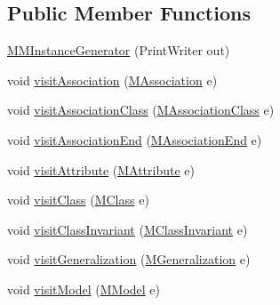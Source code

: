 \subsection*{Public Member Functions}
\begin{DoxyCompactItemize}
\item 
\hyperlink{classorg_1_1tzi_1_1use_1_1uml_1_1mm_1_1_m_m_instance_generator_ac0f6502d926d16ac433a7df353c2992a}{M\-M\-Instance\-Generator} (Print\-Writer out)
\item 
void \hyperlink{classorg_1_1tzi_1_1use_1_1uml_1_1mm_1_1_m_m_instance_generator_a21ebb5146935bb8b26401562a7734960}{visit\-Association} (\hyperlink{interfaceorg_1_1tzi_1_1use_1_1uml_1_1mm_1_1_m_association}{M\-Association} e)
\item 
void \hyperlink{classorg_1_1tzi_1_1use_1_1uml_1_1mm_1_1_m_m_instance_generator_a54fe169371d10caef410f4f86564de87}{visit\-Association\-Class} (\hyperlink{interfaceorg_1_1tzi_1_1use_1_1uml_1_1mm_1_1_m_association_class}{M\-Association\-Class} e)
\item 
void \hyperlink{classorg_1_1tzi_1_1use_1_1uml_1_1mm_1_1_m_m_instance_generator_aab9bb303d302971e972638e3a37b2390}{visit\-Association\-End} (\hyperlink{classorg_1_1tzi_1_1use_1_1uml_1_1mm_1_1_m_association_end}{M\-Association\-End} e)
\item 
void \hyperlink{classorg_1_1tzi_1_1use_1_1uml_1_1mm_1_1_m_m_instance_generator_a0b27339eea20544956859e117a580df7}{visit\-Attribute} (\hyperlink{classorg_1_1tzi_1_1use_1_1uml_1_1mm_1_1_m_attribute}{M\-Attribute} e)
\item 
void \hyperlink{classorg_1_1tzi_1_1use_1_1uml_1_1mm_1_1_m_m_instance_generator_a96b155df770c44a7fa6490a52486492c}{visit\-Class} (\hyperlink{interfaceorg_1_1tzi_1_1use_1_1uml_1_1mm_1_1_m_class}{M\-Class} e)
\item 
void \hyperlink{classorg_1_1tzi_1_1use_1_1uml_1_1mm_1_1_m_m_instance_generator_ace1ecb4a953d6bdbcfed0ba90346ab26}{visit\-Class\-Invariant} (\hyperlink{classorg_1_1tzi_1_1use_1_1uml_1_1mm_1_1_m_class_invariant}{M\-Class\-Invariant} e)
\item 
void \hyperlink{classorg_1_1tzi_1_1use_1_1uml_1_1mm_1_1_m_m_instance_generator_a9dac770c92cd1c6b3d7b17d93d313d54}{visit\-Generalization} (\hyperlink{classorg_1_1tzi_1_1use_1_1uml_1_1mm_1_1_m_generalization}{M\-Generalization} e)
\item 
void \hyperlink{classorg_1_1tzi_1_1use_1_1uml_1_1mm_1_1_m_m_instance_generator_aa43d32e691c831bc24394f10082d00f7}{visit\-Model} (\hyperlink{classorg_1_1tzi_1_1use_1_1uml_1_1mm_1_1_m_model}{M\-Model} e)

\end{DoxyCompactItemize}
